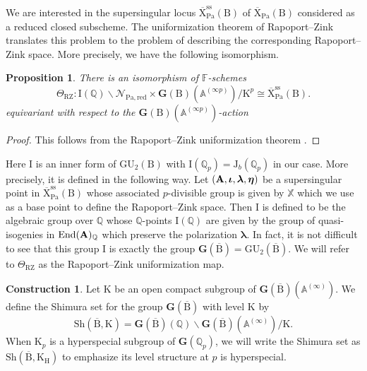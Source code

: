 \documentclass[10pt]{amsart}
\numberwithin{equation}{section}
\newtheorem{proposition}[equation]{Proposition}
\theoremstyle{definition}
\newtheorem{construction}[equation]{Construction}
\def\Pa{\mathrm{Pa}}
\DeclareMathOperator{\End}{End}
\def\calN{\mathcal{N}}
\def\AAA{\mathbb{A}}
\def\FF{\mathbb{F}}
\def\bfG{\mathbf{G}}
\def\QQ{\mathbb{Q}}
\def\XX{\mathbb{X}}
\def\rmB{\mathrm{B}}
\def\rmH{\mathrm{H}}
\def\rmI{\mathrm{I}}
\def\rmJ{\mathrm{J}}
\def\rmK{\mathrm{K}}
\def\rmX{\mathrm{X}}
\def\Sh{\mathrm{Sh}}
\begin{document}
We are interested in the supersingular locus  $\overline{\rmX}^{\mathrm{ss}}_{\Pa}(\rmB)$ of $\overline{\rmX}_{\Pa}(\rmB)$ considered as a reduced closed subscheme. The uniformization theorem of Rapoport--Zink translates this problem to the problem of  describing the corresponding Rapoport--Zink space. More precisely, we have the following isomorphism.

\begin{proposition}\label{uniformization}
There is an isomorphism of $\FF$-schemes
\begin{equation*}
\Theta_{\mathrm{RZ}}:\rmI(\QQ)\backslash {\calN}_{\Pa, \mathrm{red}}\times  \bfG({\rmB})(\AAA^{(\infty p)})/\rmK^{p} \cong \overline{\rmX}^{\mathrm{ss}}_{\Pa}(\rmB).
\end{equation*}
equivariant with respect to the $\bfG({\rmB})(\AAA^{(\infty p)})$-action
\end{proposition} 
\begin{proof}
This follows from the Rapoport--Zink uniformization theorem \cite[Theorem 6.1]{RZ-space}.
\end{proof}

Here $\rmI$ is an inner form of $\mathrm{GU}_{2}(\rmB)$ with $\rmI(\QQ_{p})=\rmJ_{b}(\QQ_{p})$ in our case. More precisely, it is defined in the following way. Let  $(\bf{A}, \boldsymbol{\iota}, \boldsymbol{\lambda}, \boldsymbol{\eta})$ be a supersingular point in $\overline{\rmX}^{\mathrm{ss}}_{\Pa}(\rmB)$ whose associated $p$-divisible group is given by $\XX$ which we use as a base point to define the Rapoport--Zink space. Then $\rmI$ is defined to be the algebraic group over $\QQ$ whose $\QQ$-points $\rmI(\QQ)$ are given by the group of quasi-isogenies in $\End(\bf{A})_{\QQ}$ which preserve the polarization $\boldsymbol{\lambda}$. In fact, it is not difficult to see that this group $\rmI$ is exactly the group $\bfG(\overline{\rmB})=\mathrm{GU}_{2}(\overline{\rmB})$. We will refer to $\Theta_{\mathrm{RZ}}$ as the Rapoport--Zink uniformization map.

\begin{construction}
Let $\rmK$ be an open compact subgroup of $\bfG(\overline{\rmB})(\mathbb{A}^{(\infty)})$. We define the Shimura set for the group $\bfG(\overline{\rmB})$ with level $\rmK$ by
\begin{equation*}
\Sh(\overline{\rmB}, \rmK)=\bfG(\overline{\rmB})(\QQ)\backslash \bfG(\overline{\rmB})(\mathbb{A}^{(\infty)})/\rmK.
\end{equation*}
When $\rmK_{p}$ is a hyperspecial subgroup of $\bfG(\QQ_{p})$, we will write the Shimura set as $\Sh(\overline{\rmB}, \rmK_{\rmH})$ to emphasize its level structure at $p$ is hyperspecial. 
\end{construction}
\end{document}
